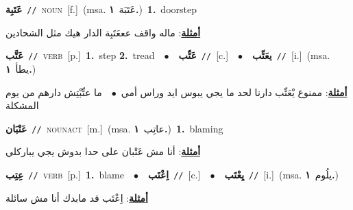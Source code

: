 \documentclass[10pt,a4paper,twoside]{article} %
\begin{document}
\begin{multicols}{2}
{\setlength\topsep{0pt}\textbf{\foreignlanguage{arabic}{عَتَبِة}}\ {\color{gray}\texttt{//}\color{black}}\ \textsc{noun}\ [f.]\ \color{gray}(msa. \foreignlanguage{arabic}{عَتَبَة}~\foreignlanguage{arabic}{\textbf{١.}})\color{black}\ \textbf{1.}~doorstep\  \begin{flushright}\color{gray}\foreignlanguage{arabic}{\textbf{\underline{\foreignlanguage{arabic}{أمثلة}}}: ماله واقف عععَتَبِة الدار هيك مثل الشحادين}\end{flushright}\color{black}} \vspace{2mm}

{\setlength\topsep{0pt}\textbf{\foreignlanguage{arabic}{عَتَّب}}\ {\color{gray}\texttt{//}\color{black}}\ \textsc{verb}\ [p.]\ \textbf{1.}~step  \textbf{2.}~tread\ \ $\bullet$\ \ \setlength\topsep{0pt}\textbf{\foreignlanguage{arabic}{عَتِّب}}\ {\color{gray}\texttt{//}\color{black}}\ [c.]\ \ $\bullet$\ \ \setlength\topsep{0pt}\textbf{\foreignlanguage{arabic}{يعَتِّب}}\ {\color{gray}\texttt{//}\color{black}}\ [i.]\ \color{gray}(msa. \foreignlanguage{arabic}{يطأ}~\foreignlanguage{arabic}{\textbf{١.}})\color{black}\  \begin{flushright}\color{gray}\foreignlanguage{arabic}{\textbf{\underline{\foreignlanguage{arabic}{أمثلة}}}: ممنوع يْعَتِّب دارنا لحد ما يجي يبوس ايد وراس أمي\ $\bullet$\ \  ما عتِّبْتِش دارهم من يوم المشكلة}\end{flushright}\color{black}} \vspace{2mm}

{\setlength\topsep{0pt}\textbf{\foreignlanguage{arabic}{عَتْبَان}}\ {\color{gray}\texttt{//}\color{black}}\ \textsc{noun\textunderscore act}\ [m.]\ \color{gray}(msa. \foreignlanguage{arabic}{عاتِب}~\foreignlanguage{arabic}{\textbf{١.}})\color{black}\ \textbf{1.}~blaming\  \begin{flushright}\color{gray}\foreignlanguage{arabic}{\textbf{\underline{\foreignlanguage{arabic}{أمثلة}}}: أنا مش عَتْبان على حدا بدوش يجي يباركلي}\end{flushright}\color{black}} \vspace{2mm}

{\setlength\topsep{0pt}\textbf{\foreignlanguage{arabic}{عِتِب}}\ {\color{gray}\texttt{//}\color{black}}\ \textsc{verb}\ [p.]\ \textbf{1.}~blame\ \ $\bullet$\ \ \setlength\topsep{0pt}\textbf{\foreignlanguage{arabic}{اِعْتَب}}\ {\color{gray}\texttt{//}\color{black}}\ [c.]\ \ $\bullet$\ \ \setlength\topsep{0pt}\textbf{\foreignlanguage{arabic}{يِعْتَب}}\ {\color{gray}\texttt{//}\color{black}}\ [i.]\ \color{gray}(msa. \foreignlanguage{arabic}{يلُوم}~\foreignlanguage{arabic}{\textbf{١.}})\color{black}\  \begin{flushright}\color{gray}\foreignlanguage{arabic}{\textbf{\underline{\foreignlanguage{arabic}{أمثلة}}}: اِعْتَب قد مابدك أنا مش سائلة}\end{flushright}\color{black}} \vspace{2mm}


\end{multicols}
\end{document}
